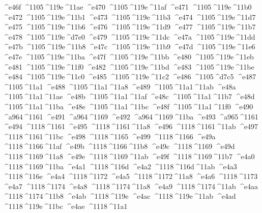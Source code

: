 \checkit ^^^^e46f ^^^^1105^^^^119e^^^^11ae
\checkit ^^^^e470 ^^^^1105^^^^119e^^^^11af
\checkit ^^^^e471 ^^^^1105^^^^119e^^^^11b0
\checkit ^^^^e472 ^^^^1105^^^^119e^^^^11b1
\checkit ^^^^e473 ^^^^1105^^^^119e^^^^11b3
\checkit ^^^^e474 ^^^^1105^^^^119e^^^^11d7
\checkit ^^^^e475 ^^^^1105^^^^119e^^^^11b6
\checkit ^^^^e476 ^^^^1105^^^^119e^^^^11d9
\checkit ^^^^e477 ^^^^1105^^^^119e^^^^11b7
\checkit ^^^^e478 ^^^^1105^^^^119e^^^^d7e0
\checkit ^^^^e479 ^^^^1105^^^^119e^^^^11dc
\checkit ^^^^e47a ^^^^1105^^^^119e^^^^11dd
\checkit ^^^^e47b ^^^^1105^^^^119e^^^^11b8
\checkit ^^^^e47c ^^^^1105^^^^119e^^^^11b9
\checkit ^^^^e47d ^^^^1105^^^^119e^^^^11e6
\checkit ^^^^e47e ^^^^1105^^^^119e^^^^11ba
\checkit ^^^^e47f ^^^^1105^^^^119e^^^^11bb
\checkit ^^^^e480 ^^^^1105^^^^119e^^^^11eb
\checkit ^^^^e481 ^^^^1105^^^^119e^^^^11f0
\checkit ^^^^e482 ^^^^1105^^^^119e^^^^11bd
\checkit ^^^^e483 ^^^^1105^^^^119e^^^^11be
\checkit ^^^^e484 ^^^^1105^^^^119e^^^^11c0
\checkit ^^^^e485 ^^^^1105^^^^119e^^^^11c2
\checkit ^^^^e486 ^^^^1105^^^^d7c5
\checkit ^^^^e487 ^^^^1105^^^^11a1
\checkit ^^^^e488 ^^^^1105^^^^11a1^^^^11a8
\checkit ^^^^e489 ^^^^1105^^^^11a1^^^^11ab
\checkit ^^^^e48a ^^^^1105^^^^11a1^^^^11ae
\checkit ^^^^e48b ^^^^1105^^^^11a1^^^^11af
\checkit ^^^^e48c ^^^^1105^^^^11a1^^^^11b7
\checkit ^^^^e48d ^^^^1105^^^^11a1^^^^11ba
\checkit ^^^^e48e ^^^^1105^^^^11a1^^^^11bc
\checkit ^^^^e48f ^^^^1105^^^^11a1^^^^11f0
\checkit ^^^^e490 ^^^^a964^^^^1161
\checkit ^^^^e491 ^^^^a964^^^^1169
\checkit ^^^^e492 ^^^^a964^^^^1169^^^^11ba
\checkit ^^^^e493 ^^^^a965^^^^1161
\checkit ^^^^e494 ^^^^1118^^^^1161
\checkit ^^^^e495 ^^^^1118^^^^1161^^^^11a8
\checkit ^^^^e496 ^^^^1118^^^^1161^^^^11ab
\checkit ^^^^e497 ^^^^1118^^^^1161^^^^11bc
\checkit ^^^^e498 ^^^^1118^^^^1165
\checkit ^^^^e499 ^^^^1118^^^^1166
\checkit ^^^^e49a ^^^^1118^^^^1166^^^^11af
\checkit ^^^^e49b ^^^^1118^^^^1166^^^^11b8
\checkit ^^^^e49c ^^^^1118^^^^1169
\checkit ^^^^e49d ^^^^1118^^^^1169^^^^11a8
\checkit ^^^^e49e ^^^^1118^^^^1169^^^^11ab
\checkit ^^^^e49f ^^^^1118^^^^1169^^^^11b7
\checkit ^^^^e4a0 ^^^^1118^^^^1169^^^^11ba
\checkit ^^^^e4a1 ^^^^1118^^^^116d
\checkit ^^^^e4a2 ^^^^1118^^^^116d^^^^11ab
\checkit ^^^^e4a3 ^^^^1118^^^^116e
\checkit ^^^^e4a4 ^^^^1118^^^^1172
\checkit ^^^^e4a5 ^^^^1118^^^^1172^^^^11a8
\checkit ^^^^e4a6 ^^^^1118^^^^1173
\checkit ^^^^e4a7 ^^^^1118^^^^1174
\checkit ^^^^e4a8 ^^^^1118^^^^1174^^^^11a8
\checkit ^^^^e4a9 ^^^^1118^^^^1174^^^^11ab
\checkit ^^^^e4aa ^^^^1118^^^^1174^^^^11b8
\checkit ^^^^e4ab ^^^^1118^^^^119e
\checkit ^^^^e4ac ^^^^1118^^^^119e^^^^11ab
\checkit ^^^^e4ad ^^^^1118^^^^119e^^^^11bc
\checkit ^^^^e4ae ^^^^1118^^^^11a1
